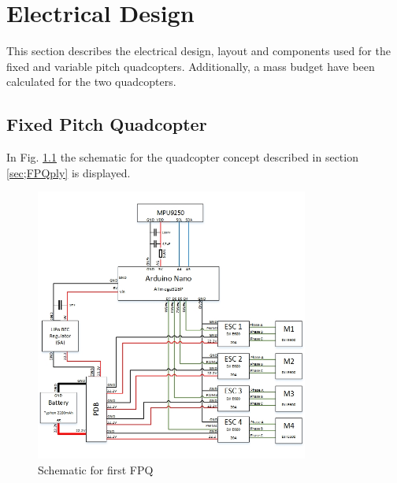 \chapter{Electrical Design}
This section describes the electrical design, layout and components used for the fixed and variable pitch quadcopters. Additionally, a mass budget have been calculated for the two quadcopters.

\section{Fixed Pitch Quadcopter}
In Fig. \ref{fig:fpqsch} the schematic for the quadcopter concept described in section \ref{sec;FPQply} is displayed.

\begin{figure}[H]
    \centering
    \includegraphics[width = 0.8\textwidth]{VAPIQ-PICTURES/shemfpq}
    \caption{Schematic for first FPQ}
    \label{fig:fpqsch}
\end{figure}

